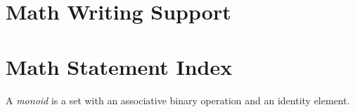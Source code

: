 
    \section{Math Writing Support}


    \section{Math Statement Index}
        \begin{definition}[Monoid]
            A \emph{monoid} is a set with an associative binary operation and an identity element.
        \end{definition}